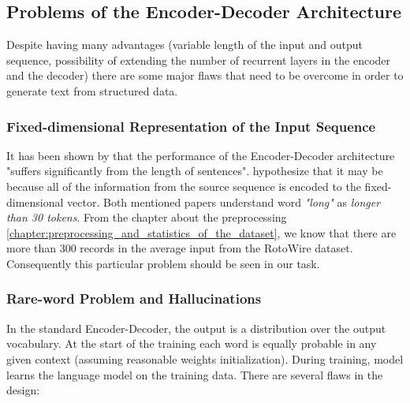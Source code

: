\subsection{Problems of the Encoder-Decoder Architecture}

Despite having many advantages (variable length of the input and output sequence, possibility of extending the number of recurrent layers in the encoder and the decoder) there are some major flaws that need to be overcome in order to generate text from structured data.

\subsubsection{Fixed-dimensional Representation of the Input Sequence} \label{subsubsection:fixed_dimensional_repre_problem}

It has been shown by \citet{cho2014properties} that the performance of the Encoder-Decoder architecture "suffers significantly from the length of sentences". \citet{bahdanau2016neural} hypothesize that it may be because all of the information from the source sequence is encoded to the fixed-dimensional vector. Both mentioned papers understand word \emph{"long"} as \emph{longer than 30 tokens}. From the chapter about the preprocessing \ref{chapter:preprocessing_and_statistics_of_the_dataset}, we know that there are more than 300 records in the average input from the RotoWire dataset. Consequently this particular problem should be seen in our task. 

\subsubsection{Rare-word Problem and Hallucinations} \label{subsubsection:rare_word_problem}

In the standard Encoder-Decoder, the output is a distribution over the output vocabulary. At the start of the training each word is equally probable in any given context (assuming reasonable weights initialization). During training, model learns the language model on the training data. There are several flaws in the design:

